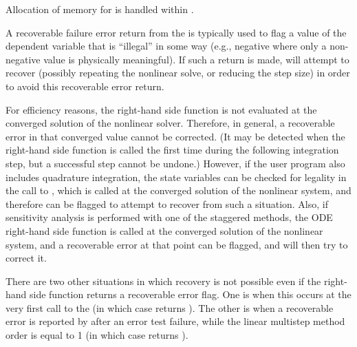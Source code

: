 {
  Allocation of memory for  is handled within {\cvodes}.

  A recoverable failure error return from the  is typically used to
  flag a value of the dependent variable  that is ``illegal'' in
  some way (e.g., negative where only a non-negative value is physically
  meaningful).  If such a return is made, {\cvodes} will attempt to recover
  (possibly repeating the nonlinear solve, or reducing the step size)
  in order to avoid this recoverable error return.

  For efficiency reasons, the right-hand side function is not evaluated
  at the converged solution of the nonlinear solver. Therefore, in general, a
  recoverable error in that converged value cannot be corrected.  (It may be
  detected when the right-hand side function is called the first time during
  the following integration step, but a successful step cannot be undone.)
  However, if the user program also includes quadrature integration, the
  state variables can be checked for legality in the call to
  , which is called at the converged solution of the
  nonlinear system, and therefore {\cvodes} can be flagged to attempt
  to recover from such a situation. Also, if sensitivity analysis is
  performed with one of the staggered methods, the ODE right-hand side
  function is called at the converged solution of the nonlinear system,
  and a recoverable error at that point can be flagged, and {\cvodes}
  will then try to correct it.

  There are two other situations in which recovery is not possible
  even if the right-hand side function returns a recoverable error flag.
  One is when this occurs at the very first call to the 
  (in which case {\cvodes} returns ).
  The other is when a recoverable error is reported by 
  after an error test failure, while the linear multistep method order is
  equal to 1 (in which case {\cvodes} returns ).
}

